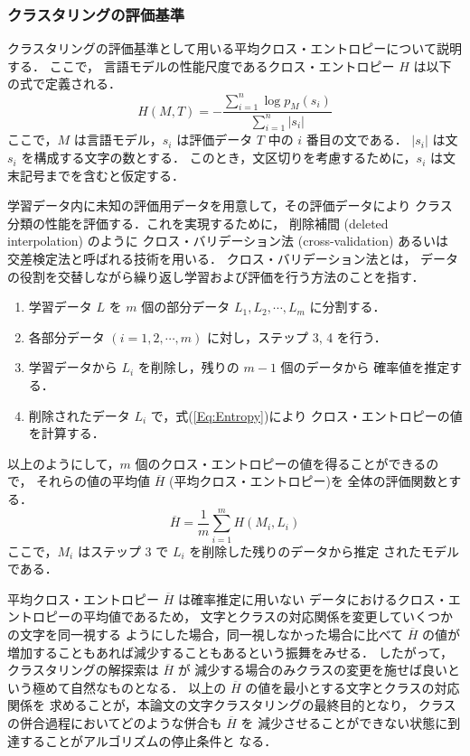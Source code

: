 \subsubsection{クラスタリングの評価基準}

クラスタリングの評価基準として用いる平均クロス・エントロピーについて説明する．
ここで，
言語モデルの性能尺度であるクロス・エントロピー $H$ は以下の式で定義される．
\begin{equation}
H(M, T) = -\frac{\sum_{i=1}^n \log p_M(s_i)}{\sum_{i=1}^n |s_i|}
\label{Eq:Entropy}
\end{equation}
ここで，$M$ は言語モデル，$s_i$ は評価データ $T$ 中の $i$ 番目の文である．
$|s_i|$ は文 $s_i$ を構成する文字の数とする．
このとき，文区切りを考慮するために，$s_i$ は文末記号までを含むと仮定する．

学習データ内に未知の評価用データを用意して，その評価データにより
クラス分類の性能を評価する．これを実現するために，
削除補間 (deleted interpolation) のように
クロス・バリデーション法 (cross-validation) あるいは
交差検定法と呼ばれる技術を用いる．
クロス・バリデーション法とは，
データの役割を交替しながら繰り返し学習および評価を行う方法のことを指す．
\begin{enumerate}
\item 学習データ $L$ を $m$ 個の部分データ $L_1, L_2, \cdots, L_m$ に分割する．
\item 各部分データ $(i = 1, 2, \cdots, m)$ に対し，ステップ 3, 4 を行う．
\item 学習データから $L_i$ を削除し，残りの $m-1$ 個のデータから
確率値を推定する．
\item 削除されたデータ $L_i$ で，式(\ref{Eq:Entropy})により
クロス・エントロピーの値を計算する．
\end{enumerate}
以上のようにして，$m$ 個のクロス・エントロピーの値を得ることができるので，
それらの値の平均値 $\overline{H}$ (平均クロス・エントロピー)を
全体の評価関数とする．
\begin{equation}
\overline{H} = \frac{1}{m} \sum_{i=1}^m H(M_i, L_i)
\end{equation}
ここで，$M_i$ はステップ 3 で $L_i$ を削除した残りのデータから推定
されたモデルである．

平均クロス・エントロピー $\overline{H}$ は確率推定に用いない
データにおけるクロス・エントロピーの平均値であるため，
文字とクラスの対応関係を変更していくつかの文字を同一視する
ようにした場合，同一視しなかった場合に比べて $\overline{H}$ の値が
増加することもあれば減少することもあるという振舞をみせる．
したがって，クラスタリングの解探索は $\overline{H}$ が
減少する場合のみクラスの変更を施せば良いという極めて自然なものとなる．
以上の $\overline{H}$ の値を最小とする文字とクラスの対応関係を
求めることが，本論文の文字クラスタリングの最終目的となり，
クラスの併合過程においてどのような併合も $\overline{H}$ を
減少させることができない状態に到達することがアルゴリズムの停止条件と
なる．
\vspace{-2mm}

